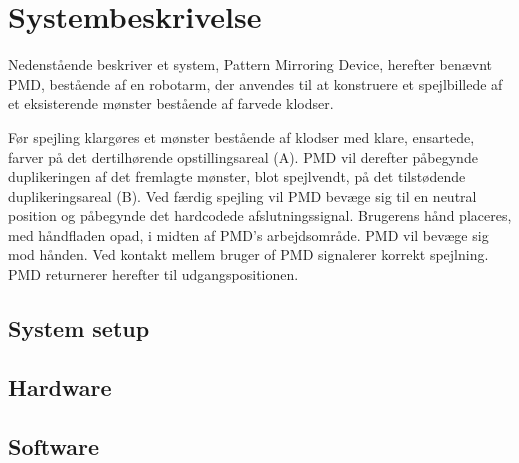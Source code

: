 \chapter{Systembeskrivelse}\label{chap:Systembeskrivelse}
Nedenstående beskriver et system, Pattern Mirroring Device, herefter benævnt PMD, bestående af en
robotarm, der anvendes til at konstruere et spejlbillede af et eksisterende mønster bestående af
farvede klodser.

Før spejling klargøres et mønster bestående af klodser med klare, ensartede, farver på det
dertilhørende opstillingsareal (A).
PMD vil derefter påbegynde duplikeringen af det fremlagte mønster, blot spejlvendt, på det
tilstødende duplikeringsareal (B).
Ved færdig spejling vil PMD bevæge sig til en neutral position og påbegynde det hard­codede
afslutningssignal. Brugerens hånd placeres, med håndfladen opad, i midten af PMD’s
arbejdsområde. PMD vil bevæge sig mod hånden. Ved kontakt
mellem bruger of PMD signalerer korrekt spejlning. PMD returnerer herefter til udgangspositionen.

\section{System setup}\label{sec:SystemSetup}

\section{Hardware}\label{sec:Hardware}

\section{Software}\label{sec:Software}